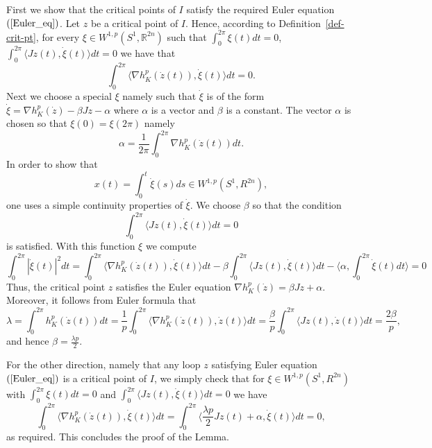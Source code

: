\documentclass[12pt]{article}
\begin{document}
 First we show that the critical points of
$I$ satisfy the required Euler equation~$(\ref{Euler_eq})$. Let $z$
be a critical point of $I$. Hence, according to
Definition~\ref{def-crit-pt},  for every $\xi \in
W^{1,p}(S^1,\mathbb R^{2n})$ such that $\int_0^{2 \pi} \xi(t)dt =
0$,
$ \int_0^{2 \pi} \langle J z(t) , {\dot \xi}(t) \rangle dt =0$
we have that $$ \int_0^{2 \pi} \langle \nabla h_K^p({\dot z}(t)) ,
{\dot \xi}(t) \rangle dt = 0. $$ Next we choose a special $\xi$
namely such that $\dot \xi$ is of the form $ {\dot \xi} = \nabla
h_K^p({\dot z})- \beta J z - \alpha$ where $\alpha$ is a vector and
$\beta$ is a constant. The vector $ \alpha$ is chosen so that
$\xi(0) = \xi(2 \pi)$ namely $$ \alpha = {\frac 1 {2 \pi}} \int_0^{2
\pi} \nabla h_K^p( \dot z(t))dt. $$ In order to show that $$ x(t) =
\int_0^t \dot \xi(s)ds \in W^{1,p}(S^1,R^{2n}),$$ one uses a simple
continuity properties of $\dot \xi$. We choose $\beta$ so that the
condition $$ \int_0^{2 \pi} \langle Jz(t), \dot \xi(t) \rangle dt=
0$$ is satisfied. With this function $\xi$ we compute
$$ \int_0^{2 \pi} | {\dot \xi}(t) |^2 dt =  \int_0^{2 \pi} \langle \nabla
h_K^p({\dot z}(t)) , {\dot \xi}(t) \rangle dt - \beta \int_0^{2
\pi} \langle Jz(t) , {\dot \xi}(t) \rangle dt - \langle \alpha,
\int_0^{2 \pi} {\dot \xi}(t)dt \rangle  = 0
$$
Thus, the critical point $z$ satisfies the Euler equation $\nabla
h_K^p({\dot z}) =  \beta J z + \alpha$. Moreover, it follows from
Euler formula that
$$ \lambda = \int_0^{2 \pi} h_K^p({\dot z}(t))dt = {\frac 1 p} \int _0^{2 \pi}
\langle  \nabla  h_K^p({\dot z}(t)) , {\dot z}(t) \rangle dt =
{\frac \beta p} \int_0^{2\pi} \langle Jz(t), {\dot z}(t) \rangle
dt = {\frac {2 \beta} p},$$ and hence $\beta = {\frac {\lambda p}
2}$.

For the other direction, namely that any loop $z$ satisfying Euler
equation~$(\ref{Euler_eq})$ is a critical point of $I$, we simply
check that for $\xi \in W^{1,p}(S^1,R^{2n})$ with $\int_0^{2 \pi}
\xi(t)dt =0$ and $\int_0^{2 \pi} \langle Jz(t) , \dot \xi(t)
\rangle dt = 0$ we have
$$\int_0^{2 \pi} \langle \nabla h_K^p (\dot z(t)), \dot \xi(t) \rangle  dt=
\int_0^{2 \pi} \langle {\frac {\lambda p} 2} Jz(t) + \alpha, \dot
\xi(t) \rangle  dt = 0,$$ as required. This concludes the proof of
the Lemma.
\end{document}
